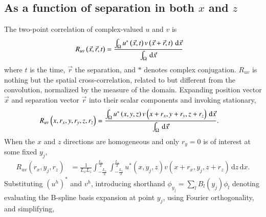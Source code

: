 \documentclass[letterpaper,11pt,nointlimits,reqno]{amsart}
\begin{document}
\subsection{As a function of separation in both $x$ and $z$}
The two-point correlation of complex-valued $u$ and $v$ is
\begin{align}
R_{uv} \left( \vec{x}, \vec{r}, t \right)
  &= \frac{%
        \int_\Omega
        u^\ast\left(\vec{x}          , t\right)
        v     \left(\vec{x} + \vec{r}, t\right)
        \,\mathrm{d}\vec{x}
     }{%
        \int_\Omega
        \,\mathrm{d}\vec{x}
     }
\end{align}
where $t$ is the time, $\vec{r}$ the separation, and $\ast$ denotes complex
conjugation.  $R_{uv}$ is nothing but the spatial cross-correlation, related to
but different from the convolution, normalized by the measure of the domain.
Expanding position vector $\vec{x}$ and separation vector $\vec{r}$ into their
scalar components and invoking stationary,
\begin{align}
R_{uv} \left( x, r_x, y, r_y, z, r_z \right)
  &= \frac{%
        \int_\Omega
        u^\ast\left( x      , y      , z       \right)
        v     \left( x + r_x, y + r_y, z + r_z \right)
        \,\mathrm{d}\vec{x}
     }{%
        \int_\Omega
        \,\mathrm{d}\vec{x}
    }.
\end{align}
When the $x$ and $z$ directions are homogeneous and only $r_y=0$ is of interest
at some fixed $y_j$,
\begin{align}
R_{uv} \left( r_x, y_j, r_z \right)
  &= \frac{1}{L_x L_z}
     \int_{-\frac{L_x}{2}}^{\frac{L_x}{2}}
     \int_{-\frac{L_z}{2}}^{\frac{L_z}{2}}
       u^\ast\left( x      , y_j, z       \right)
       v     \left( x + r_x, y_j, z + r_z \right)
     \,\mathrm{d}z
     \,\mathrm{d}x.
\end{align}
Substituting $(u^h)^\ast$ and $v^h$, introducing shorthand $\phi_{y_j} =
\sum_{l} B_l\left(y_j\right) \phi_l$ denoting evaluating the B-spline basis
expansion at point $y_j$, using Fourier orthogonality, and simplifying,
\end{document}
